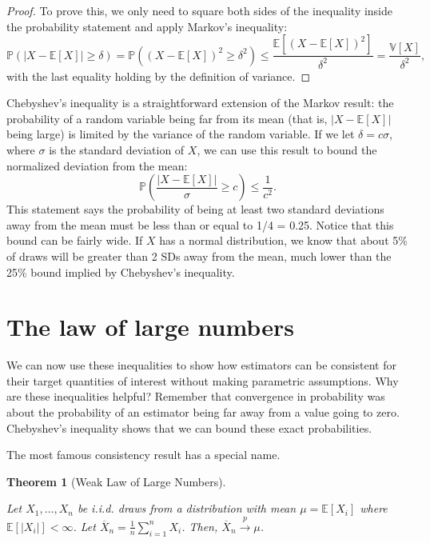 \documentclass[
  13pt,
  letterpaper,
  DIV=11,
  numbers=noendperiod]{scrreprt}
\newcommand{\E}{\mathbb{E}}
\newcommand{\V}{\mathbb{V}}
\renewcommand{\P}{\mathbb{P}}
\newcommand{\Xbar}{\overline{X}}
\newcommand{\inprob}{\overset{p}{\to}}
\theoremstyle{plain}
\newtheorem{theorem}{Theorem}[chapter]
\theoremstyle{plain}
\theoremstyle{definition}
\theoremstyle{definition}
\theoremstyle{remark}
\begin{document}
\begin{proof}
To prove this, we only need to square both sides of the inequality
inside the probability statement and apply Markov's inequality: \[
\P\left( |X - \E[X]| \geq \delta \right) = \P((X-\E[X])^2 \geq \delta^2) \leq \frac{\E[(X - \E[X])^2]}{\delta^2} = \frac{\V[X]}{\delta^2},
\] with the last equality holding by the definition of variance.
\end{proof}

Chebyshev's inequality is a straightforward extension of the Markov
result: the probability of a random variable being far from its mean
(that is, \(|X-\E[X]|\) being large) is limited by the variance of the
random variable. If we let \(\delta = c\sigma\), where \(\sigma\) is the
standard deviation of \(X\), we can use this result to bound the
normalized deviation from the mean: \[
\P\left(\frac{|X - \E[X]|}{\sigma} \geq c \right) \leq \frac{1}{c^2}.
\] This statement says the probability of being at least two standard
deviations away from the mean must be less than or equal to 1/4 = 0.25.
Notice that this bound can be fairly wide. If \(X\) has a normal
distribution, we know that about 5\% of draws will be greater than 2 SDs
away from the mean, much lower than the 25\% bound implied by
Chebyshev's inequality.

\section{The law of large numbers}\label{the-law-of-large-numbers}

We can now use these inequalities to show how estimators can be
consistent for their target quantities of interest without making
parametric assumptions. Why are these inequalities helpful? Remember
that convergence in probability was about the probability of an
estimator being far away from a value going to zero. Chebyshev's
inequality shows that we can bound these exact probabilities.

The most famous consistency result has a special name.

\begin{theorem}[Weak Law of Large
Numbers]\protect\hypertarget{thm-lln}{}\label{thm-lln}

Let \(X_1, \ldots, X_n\) be i.i.d. draws from a distribution with mean
\(\mu = \E[X_i]\) where \(\E[|X_i|] < \infty\). Let
\(\Xbar_n = \frac{1}{n} \sum_{i =1}^n X_i\). Then,
\(\Xbar_n \inprob \mu\).

\end{theorem}
\end{document}

